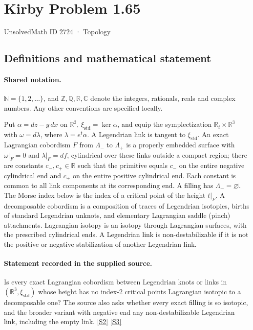 \documentclass[11pt]{article}
\newcommand{\sref}[2]{\hyperlink{source:#1:#2}{[S#2]}}
\begin{document}
\setcounter{section}{2723}
\section{Kirby Problem 1.65}\label{2724}
{\small\sffamily UnsolvedMath ID 2724 · Topology}
\subsection{Definitions and mathematical statement}

\paragraph{Shared notation.}$\mathbb N=\{1,2,\ldots\}$, and $\mathbb Z,\mathbb Q,\mathbb R,\mathbb C$ denote the integers, rationals, reals and complex numbers. Any other conventions are specified locally.


Put $\alpha=dz-y\,dx$ on $\mathbb R^3$, $\xi_{\mathrm{std}}=\ker\alpha$, and equip the symplectization $\mathbb R_t\times\mathbb R^3$ with $\omega=d\lambda$, where $\lambda=e^t\alpha$. A Legendrian link is tangent to $\xi_{\mathrm{std}}$. An exact Lagrangian cobordism $F$ from $\Lambda_-$ to $\Lambda_+$ is a properly embedded surface with $\omega|_F=0$ and $\lambda|_F=df$, cylindrical over these links outside a compact region; there are constants $c_-,c_+\in\mathbb R$ such that the primitive equals $c_-$ on the entire negative cylindrical end and $c_+$ on the entire positive cylindrical end. Each constant is common to all link components at its corresponding end. A filling has $\Lambda_-=\varnothing$. The Morse index below is the index of a critical point of the height $t|_F$. A decomposable cobordism is a composition of traces of Legendrian isotopies, births of standard Legendrian unknots, and elementary Lagrangian saddle (pinch) attachments. Lagrangian isotopy is an isotopy through Lagrangian surfaces, with the prescribed cylindrical ends. A Legendrian link is non-destabilizable if it is not the positive or negative stabilization of another Legendrian link.
\paragraph{Statement recorded in the supplied source.}
Is every exact Lagrangian cobordism between Legendrian knots or links in $(\mathbb R^3,\xi_{\mathrm{std}})$ whose height has no index-2 critical points Lagrangian isotopic to a decomposable one? The source also asks whether every exact filling is so isotopic, and the broader variant with negative end any non-destabilizable Legendrian link, including the empty link. \sref{2724}{2} \sref{2724}{3}
\end{document}

